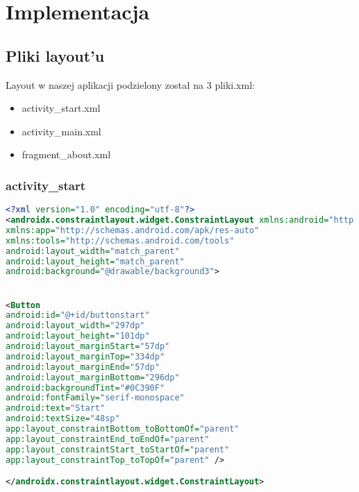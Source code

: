 	\newpage
\section{Implementacja}		%
\subsection{Pliki layout'u}
\hspace{0.60cm}Layout w naszej aplikacji podzielony został na 3 pliki.xml:
\begin{itemize}
	\item activity\_start.xml
	\item activity\_main.xml
	\item fragment\_about.xml
\end{itemize}

\subsubsection{activity\_start}
\begin{lstlisting}[caption=Activity\_start, label={lst:kod.xml}, language=XML]
<?xml version="1.0" encoding="utf-8"?>
<androidx.constraintlayout.widget.ConstraintLayout xmlns:android="http://schemas.android.com/apk/res/android"
xmlns:app="http://schemas.android.com/apk/res-auto"
xmlns:tools="http://schemas.android.com/tools"
android:layout_width="match_parent"
android:layout_height="match_parent"
android:background="@drawable/background3">


<Button
android:id="@+id/buttonstart"
android:layout_width="297dp" 
android:layout_height="101dp" 
android:layout_marginStart="57dp"
android:layout_marginTop="334dp"
android:layout_marginEnd="57dp"
android:layout_marginBottom="296dp"
android:backgroundTint="#0C390F"
android:fontFamily="serif-monospace"
android:text="Start"
android:textSize="48sp"
app:layout_constraintBottom_toBottomOf="parent"
app:layout_constraintEnd_toEndOf="parent"
app:layout_constraintStart_toStartOf="parent"
app:layout_constraintTop_toTopOf="parent" />

</androidx.constraintlayout.widget.ConstraintLayout>
\end{lstlisting}